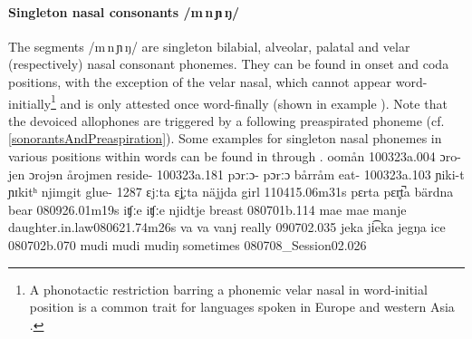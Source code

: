 \paragraph{Singleton nasal consonants /m\,n\,ɲ\,ŋ/}
The segments /m\,n\,ɲ\,ŋ/ are singleton bilabial, alveolar, palatal and velar (respectively) nasal consonant phonemes. 
They can be found in onset and coda positions, with the exception of the velar nasal, which cannot appear word-initially\footnote{A phonotactic restriction barring a phonemic velar nasal in word-initial position is a common trait for languages spoken in Europe and western Asia \citep[cf.][]{Anderson2008WALS}.} 
and is only attested once word-finally (shown in example ). 
Note that the devoiced allophones are triggered by a following preaspirated phoneme (cf. \SEC\ref{sonorantsAndPreaspiration}).
Some examples for singleton nasal phonemes in various positions within words can be found in  through .  
			{o}{o}{mån}	{}			{100323a}{.004}
		{ɔro-jen}	{ɔrojɘn}	{årojmen}	{reside-}		{100323a}{.181}
				{pɔrːɔ-\Bf{m}}	{pɔrːɔ}	{bårråm}	{eat-}			{100323a}{.103}
				{ɲi\Bf{m}ki-t}		{ɲɪkitʰ}	{njimgit}	{glue-}			{1287}
			{\Bf{n}ɛjːta}		{ɛj̥ːta}		{näjjda}	{girl\BS{}}		{110415}{.06m31s}
			{pɛrta}		{pɛr̥t̚a}		{bärdna}	{bear\BS{}}		{080926}{.01m19s}
		{iʧːe}		{iʧːe}		{njidtje}	{breast\BS{}}	{080701b}{.114}
	{mae}		{mae}		{manje}	{daughter.in.law\BS{}}{080621}{.74m26s}
				{va\Bf{ɲ}}		{va}		{vanj}	{really}					{090702}{.035}
			{jeka}		{ji͡eka}		{jegŋa}	{ice\BS{}}		{080702b}{.070}
	{mudi}		{mudi}		{mudiŋ}	{sometimes}			{080708\_Session02}{.026}%

